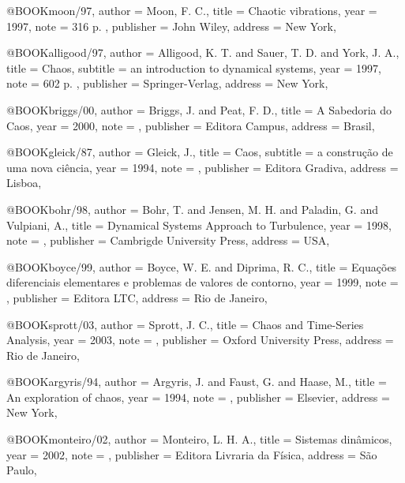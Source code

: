 @BOOK{moon/97,
author              = {Moon, F. C.},
title               = {Chaotic vibrations},
year                = {1997},
note                = {316 p. },
publisher           = {John Wiley},
address             = {New York},
}

@BOOK{alligood/97,
author              = {Alligood, K. T. and Sauer, T. D. and York, J. A.},
title               = {Chaos},
subtitle 	          = {an introduction to dynamical systems},
year                = {1997},
note                = {602 p. },
publisher           = {Springer-Verlag},
address             = {New York},
}

@BOOK{briggs/00,
author              = {Briggs, J. and Peat, F. D.},
title               = {A Sabedoria do Caos},
year                = 2000,
note                = { },
publisher           = {Editora Campus},
address             = {Brasil},
}

@BOOK{gleick/87,
author              = {Gleick, J.},
title               = {Caos},
subtitle 	          = {a construção de uma nova ciência},
year                = 1994,
note                = { },
publisher           = {Editora Gradiva},
address             = {Lisboa},
}

@BOOK{bohr/98,
author              = {Bohr, T. and Jensen, M. H. and Paladin, G. and Vulpiani, A.},
title               = {Dynamical Systems Approach to Turbulence},
year                = 1998,
note                = { },
publisher           = {Cambrigde University Press},
address             = {USA},
}

@BOOK{boyce/99,
author              = {Boyce, W. E. and Diprima, R. C.},
title               = {Equa{\c c}\~oes diferenciais elementares e problemas de valores de contorno},
year                = 1999,
note                = { },
publisher           = {Editora LTC},
address             = {Rio de Janeiro},
}

@BOOK{sprott/03,
author              = {Sprott, J. C.},
title               = {Chaos and Time-Series Analysis},
year                = 2003,
note                = { },
publisher           = {Oxford University Press},
address             = {Rio de Janeiro},
}

@BOOK{argyris/94,
author              = {Argyris, J. and Faust, G. and Haase, M.},
title               = {An exploration of chaos},
year                = 1994,
note                = { },
publisher           = {Elsevier},
address             = {New York},
}

@BOOK{monteiro/02,
author              = {Monteiro, L. H. A.},
title               = {Sistemas din\^amicos},
year                = 2002,
note                = { },
publisher           = {Editora Livraria da F\'isica},
address             = {S\~ao Paulo},
}

